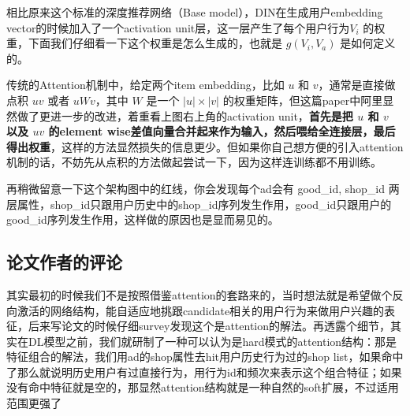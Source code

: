 \documentclass[12pt]{article}
\begin{document}
相比原来这个标准的深度推荐网络（Base model），DIN在生成用户embedding vector的时候加入了一个activation unit层，这一层产生了每个用户行为$V_i$ 的权重，下面我们仔细看一下这个权重是怎么生成的，也就是 $g(V_i, V_a)$ 是如何定义的。

传统的Attention机制中，给定两个item embedding，比如 $u$ 和 $v$，通常是直接做点积 $uv$ 或者 $uWv$，其中 $W$ 是一个 $|u|\times |v|$ 的权重矩阵，但这篇paper中阿里显然做了更进一步的改进，着重看上图右上角的activation unit，\textbf{首先是把 $u$ 和 $v$ 以及 $u v$ 的element wise差值向量合并起来作为输入，然后喂给全连接层，最后得出权重}，这样的方法显然损失的信息更少。但如果你自己想方便的引入attention机制的话，不妨先从点积的方法做起尝试一下，因为这样连训练都不用训练。

再稍微留意一下这个架构图中的红线，你会发现每个ad会有 good\_id, shop\_id 两层属性，shop\_id只跟用户历史中的shop\_id序列发生作用，good\_id只跟用户的good\_id序列发生作用，这样做的原因也是显而易见的。

\subsection{论文作者的评论}
其实最初的时候我们不是按照借鉴attention的套路来的，当时想法就是希望做个反向激活的网络结构，能自适应地挑跟candidate相关的用户行为来做用户兴趣的表征，后来写论文的时候仔细survey发现这个是attention的解法。再透露个细节，其实在DL模型之前，我们就研制了一种可以认为是hard模式的attention结构：那是特征组合的解法，我们用ad的shop属性去hit用户历史行为过的shop list，如果命中了那么就说明历史用户有过直接行为，用行为id和频次来表示这个组合特征；如果没有命中特征就是空的，那显然attention结构就是一种自然的soft扩展，不过适用范围更强了



\end{document}
